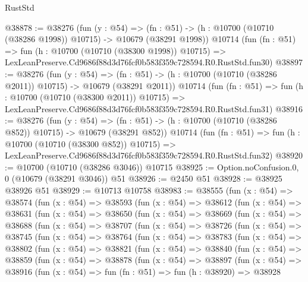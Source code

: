 \begin{lexlean}{RustStd}
\begin{coremodule}
@38878 := @38276
    (fun (y : @54) =>
    (fn : @51) -> (h : @10700 (@10710 (@38286 @1998)) @10715) -> @10679 (@38291 @1998))
    @10714
    (fun (fn : @51) =>
    fun (h : @10700 (@10710 (@38300 @1998)) @10715) =>
    LexLeanPreserve.Cd9686f88d3d76fcf0b583f359c728594.R0.RustStd.fun30)
@38897 := @38276
    (fun (y : @54) =>
    (fn : @51) -> (h : @10700 (@10710 (@38286 @2011)) @10715) -> @10679 (@38291 @2011))
    @10714
    (fun (fn : @51) =>
    fun (h : @10700 (@10710 (@38300 @2011)) @10715) =>
    LexLeanPreserve.Cd9686f88d3d76fcf0b583f359c728594.R0.RustStd.fun31)
@38916 := @38276
    (fun (y : @54) =>
    (fn : @51) -> (h : @10700 (@10710 (@38286 @852)) @10715) -> @10679 (@38291 @852))
    @10714
    (fun (fn : @51) =>
    fun (h : @10700 (@10710 (@38300 @852)) @10715) =>
    LexLeanPreserve.Cd9686f88d3d76fcf0b583f359c728594.R0.RustStd.fun32)
@38920 := @10700 (@10710 (@38286 @3046)) @10715
@38925 := Option.noConfusion.{0, 0} (@10679 (@38291 @3046)) @51
@38926 := @2450 @51
@38928 := @38925 @38926 @51
@38929 := @10713 @10758
@38983 := @38555
    (fun (x : @54) =>
    @38574
      (fun (x : @54) =>
      @38593
        (fun (x : @54) =>
        @38612
          (fun (x : @54) =>
          @38631
            (fun (x : @54) =>
            @38650
              (fun (x : @54) =>
              @38669
                (fun (x : @54) =>
                @38688
                  (fun (x : @54) =>
                  @38707
                    (fun (x : @54) =>
                    @38726
                      (fun (x : @54) =>
                      @38745
                        (fun (x : @54) =>
                        @38764
                          (fun (x : @54) =>
                          @38783
                            (fun (x : @54) =>
                            @38802
                              (fun (x : @54) =>
                              @38821
                                (fun (x : @54) =>
                                @38840
                                  (fun (x : @54) =>
                                  @38859
                                    (fun (x : @54) =>
                                    @38878
                                      (fun (x : @54) =>
                                      @38897
                                        (fun (x : @54) =>
                                        @38916
                                          (fun (x : @54) =>
                                          fun (fn : @51) =>
                                          fun (h : @38920) =>
                                          @38928

\end{coremodule}
\end{lexlean}
